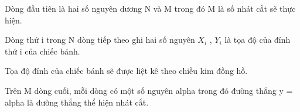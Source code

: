 Dòng đầu tiên là hai số nguyên dương N và M trong đó M là số nhát cắt sẽ thực hiện.  

   Dòng thứ i trong N dòng tiếp theo ghi hai số nguyên $X_{i}$   , $Y_{i}$   là tọa độ của đỉnh thứ i của chiếc bánh.  

   Tọa độ đỉnh của chiếc bánh sẽ được liệt kê theo chiều kim đồng hồ.  

   Trên M dòng cuối, mỗi dòng có một số nguyên alpha trong đó đường thẳng y = alpha là đường thẳng thể hiện nhát cắt.